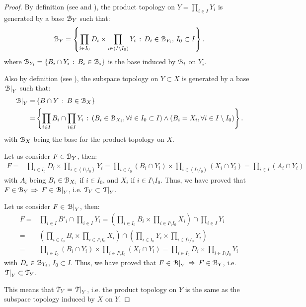 \begin{proof}
	By definition (see  and ), the product topology on $Y=\prod_{i\in I}Y_i$ is generated by a base $\EuScript{B}_Y$ such that:
	$$
	\EuScript{B}_Y=\left\{\prod_{i\in I_0}D_i\times \prod_{i\in(I\setminus I_0)}Y_i\,:\,D_i\in\EuScript{B}_{Y_i},\,I_0\subset I\right\}.
	$$
	where $\EuScript{B}_{Y_i}=\left\{B_i\cap Y_i\,:\,B_i\in \EuScript{B}_i\right\}$ is the base induced by $\EuScript{B}_i$ on $Y_i$.

	Also by definition (see ), the subspace topology on $Y\subset X$ is generated by a base $\left.\EuScript{B}\right|_{Y}$ such that:
	\begin{align*}
	\left.\EuScript{B}\right|_{Y}=&\left\{B\cap Y\,:\,B\in\EuScript{B}_X\right\}\\
	=&\left\{\prod_{i\in I}B_i\cap \prod_{i\in I}Y_i\,:\,\left(B_i\in\EuScript{B}_{X_i},\forall i\in I_0\subset I\right)\land\left(B_i=X_i, \forall i\in I\setminus I_0\right)\right\}.
	\end{align*}
	with $\EuScript{B}_X$ being the base for the product topology on $X$.

	\noindent{\boxed{\subseteq}} Let us consider $F\in \EuScript{B}_{Y}$, then:
	\begin{align*}
	F=&\prod_{i\in I_0} D_i \times \prod_{i\in(I\setminus I_0)}Y_i=\prod_{i\in I_0} (B_i\cap Y_i) \times \prod_{i\in(I\setminus I_0)}(X_i\cap Y_i)=\prod_{i\in I}(A_i\cap Y_i)
	\end{align*}
	with $A_i$ being $B_i\in \EuScript{B}_{X_i}$ if $i\in I_0$, and $X_i$ if $i\in I\setminus I_0$.
	Thus, we have proved that $F\in\EuScript{B}_Y$ $\Rightarrow$ $F\in\left.\EuScript{B}\right|_{Y}$, i.e. $\EuScript{T}_Y\subset \left.\EuScript{T}\right|_{Y}$.

	\noindent{\boxed{\supseteq}} Let us consider $F\in \left.\EuScript{B}\right|_{Y}$, then:
	\begin{align*}
		F=&\prod_{i\in I}B'_i\cap \prod_{i\in I}Y_i = \left(\prod_{i\in I_0} B_i\times \prod_{i\in I\setminus I_0} X_i\right)\cap \prod_{i\in I}Y_i\\
		=&\left(\prod_{i\in I_0} B_i\times \prod_{i\in I\setminus I_0} X_i\right)\cap \left(\prod_{i\in I_0} Y_i\times \prod_{i\in I\setminus I_0} Y_i\right)\\
		=&\prod_{i\in I_0} (B_i\cap Y_i) \times \prod_{i\in I\setminus I_0} (X_i\cap Y_i) = \prod_{i\in I_0} D_i \times \prod_{i\in I\setminus I_0} Y_i
	\end{align*}
	with $D_i\in \EuScript{B}_{Y_i}$, $I_0\subset I$. Thus, we have proved that $F\in\left.\EuScript{B}\right|_{Y}$ $\Rightarrow$ $F\in \EuScript{B}_Y$, i.e. $\left.\EuScript{T}\right|_{Y}\subset \EuScript{T}_Y$.

	This means that $\EuScript{T}_Y=\left.\EuScript{T}\right|_{Y}$, i.e. the product topology on $Y$ is the same as the subspace topology induced by $X$ on $Y$.
\end{proof}

